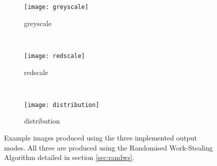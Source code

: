 \begin{figure}[h]
\centering
\begin{subfigure}[b]{0.3\textwidth}
  \centering    
  \texttt{[image: greyscale]}
  \caption{
    \tiny greyscale
  }
  \label{fig:outmodegrey}
\end{subfigure}
~ %
\begin{subfigure}[b]{0.3\textwidth}
  \centering
  \texttt{[image: redscale]}
  \caption{
    \tiny redscale
  }
  \label{fig:outmodered}
\end{subfigure}
~ %
\begin{subfigure}[b]{0.3\textwidth}
  \centering
  \texttt{[image: distribution]}
  \caption{
    \tiny distribution
  }
  \label{fig:outmodedist}
\end{subfigure}
\caption{
    Example images produced using the three implemented output modes. 
    All three are produced using the Randomised Work-Stealing Algorithm 
    detailed in section \ref{sec:randws}.
}
\label{fig:outmodes}
\end{figure}

